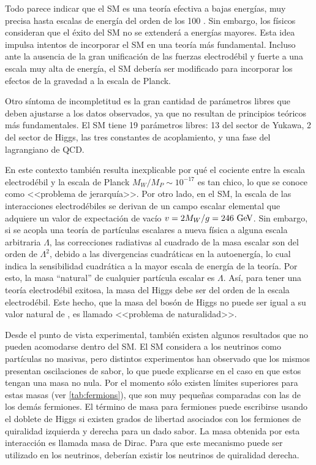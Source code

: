 Todo parece indicar que el SM es una teoría efectiva a bajas energías, muy
precisa hasta escalas de energía del orden de los 100 {\gev}. Sin embargo, los
físicos consideran que el éxito del SM no se extenderá a energías mayores. Esta
idea impulsa intentos de incorporar el SM en una teoría más fundamental. Incluso
ante la ausencia de la gran unificación de las fuerzas electrodébil y fuerte a
una escala muy alta de energía, el SM debería ser modificado para incorporar los
efectos de la gravedad a la escala de Planck.

Otro síntoma de incompletitud es la gran cantidad de parámetros libres que deben
ajustarse a los datos observados, ya que no resultan de principios teóricos más
fundamentales. El SM tiene 19 parámetros libres: 13 del sector de Yukawa, 2 del
sector de Higgs, las tres constantes de acoplamiento, y una fase del lagrangiano
de QCD.


En este contexto también resulta inexplicable por qué el cociente entre la escala
electrodébil y la escala de Planck $M_W/M_P \sim 10^{-17}$ es tan chico, lo que
se conoce como <<problema de jerarquía>>.
Por otro lado, en el SM, la escala de las interacciones electrodébiles se derivan de un
campo escalar elemental que adquiere un valor de expectación de vacío $v = 2
M_W /g = 246 \gev$. Sin embargo, si se acopla una teoría de partículas
escalares a nueva física a alguna escala arbitraria $\Lambda$, las correcciones
radiativas al cuadrado de la masa escalar son del orden de $\Lambda^2$, debido a
las divergencias cuadráticas en la autoenergía, lo cual indica la sensibilidad
cuadrática a la mayor escala de energía de la teoría. Por esto, la masa
``natural'' de cualquier partícula escalar es $\Lambda$. Así, para tener una teoría
electrodébil exitosa, la masa del Higgs debe ser del orden de la escala
electrodébil. Este hecho, que la masa del bosón de Higgs no puede ser igual a su
valor natural de , es llamado <<problema de naturalidad>>.

Desde el punto de vista experimental, también existen algunos resultados que no
pueden acomodarse dentro del SM. El SM considera a los neutrinos como partículas
no masivas, pero distintos
experimentos\cite{PhysRevLett.101.111301,PhysRevD.78.032002} han observado que
los mismos presentan oscilaciones de sabor, lo que puede explicarse en el caso
en que estos tengan una masa no nula. Por el momento sólo existen límites
superiores para estas masas (ver \cref{tab:fermions}), que son muy peque\~nas
comparadas con las de los demás fermiones. El término de masa para fermiones
puede escribirse usando el doblete de Higgs si existen grados de libertad
asociados con los fermiones de quiralidad izquierda y derecha para un dado
sabor. La masa obtenida por esta interacción es llamada masa de Dirac. Para que
este mecanismo puede ser utilizado en los neutrinos, deberían existir los
neutrinos de quiralidad derecha.

